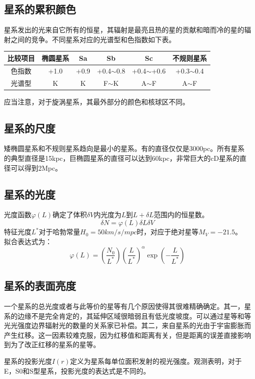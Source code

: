 \subsection{星系的累积颜色}星系发出的光来自它所有的恒星，其辐射是最亮且热的星的贡献和暗而冷的星的辐射之间的竞争。不同星系对应的光谱型和色指数如下表。
\begin{center}
	\begin{tabular}{|c|c|c|c|c|c|}
		\hline
		比较项目&椭圆星系&Sa&Sb&Sc&不规则星系\\
		\hline
		色指数&+1.0&+0.9&+0.4$\sim$0.8&+0.4$\sim$+0.6&+0.3$\sim$0.4\\
		\hline
		光谱型&K&K&F$\sim$K&A$\sim$F&A$\sim$F\\
		\hline
	\end{tabular}
\end{center}

应当注意，对于旋涡星系，其最外部分的颜色和核球区不同。
\subsection{星系的尺度}矮椭圆星系和不规则星系趋向是最小的星系。有的直径仅仅是3000pc。所有星系的典型直径是15kpc，巨椭圆星系的直径可以达到60kpc，非常巨大的cD星系的直径可以得到2Mpc。
\subsection{星系的光度}
光度函数$\varphi(L)$确定了体积$\delta V$内光度为$L$到$L+\delta L$范围内的恒星数。
\begin{equation}
	\delta N=\varphi(L)\delta L\delta V
\end{equation}
特征光度$L^{*}$对于哈勃常量$H_{0}=50km/s/mpc$时，对应于绝对星等$M_{V}=-21.5$。
拟合表达式为：
\begin{equation}
	\varphi(L)=\left(\frac{N_{0}}{L^{*}}\right)\left(\frac{L}{L^{*}}\right)^{\alpha}\exp\left(-\frac{L}{L^{*}}\right)
\end{equation}
\subsection{星系的表面亮度}一个星系的总光度或者与此等价的星等有几个原因使得其很难精确确定。其一，星系的边缘不是完全肯定的，其延伸区域很暗弱且有低光度坡度。可以通过星等和等光光强度边界辐射光的数量的关系家已补偿。其二，来自星系的光由于宇宙膨胀而产生红移。这一因素较难克服，因为红移值和距离有关，但是距离的误差直接影响到为了改正红移的星系的星等。

星系的投影光度$I(r)$定义为星系每单位面积发射的视光强度。观测表明，对于E，S0和S型星系，投影光度的表达式是不同的。

